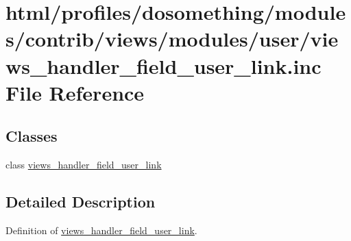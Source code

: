 \hypertarget{views__handler__field__user__link_8inc}{
\section{html/profiles/dosomething/modules/contrib/views/modules/user/views\_\-handler\_\-field\_\-user\_\-link.inc File Reference}
\label{views__handler__field__user__link_8inc}
}
\subsection*{Classes}
\begin{DoxyCompactItemize}
\item 
class \hyperlink{classviews__handler__field__user__link}{views\_\-handler\_\-field\_\-user\_\-link}
\end{DoxyCompactItemize}


\subsection{Detailed Description}
Definition of \hyperlink{classviews__handler__field__user__link}{views\_\-handler\_\-field\_\-user\_\-link}. 
